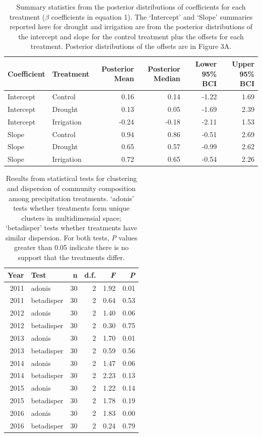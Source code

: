\documentclass[fleqn,10pt,lineno]{wlpeerj} %
\begin{document}
\begin{table}[ht]
\centering
\caption{Summary statistics from the posterior distributions of coefficients for each treatment ($\beta$ coefficients in equation 1). The `Intercept' and `Slope' summaries reported here for drought and irrigation are from the posterior distributions of the intercept and slope for the control treatment plus the offsets for each treatment. Posterior distributions of the offsets are in Figure 3A.} 
\begingroup\normalsize
\begin{tabular}{llrrrr}
  \hline
Coefficient & Treatment & Posterior Mean & Posterior Median & Lower 95\% BCI & Upper 95\% BCI \\ 
  \hline
Intercept & Control & 0.16 & 0.14 & -1.22 & 1.69 \\ 
  Intercept & Drought & 0.13 & 0.05 & -1.69 & 2.39 \\ 
  Intercept & Irrigation & -0.24 & -0.18 & -2.11 & 1.53 \\ 
  Slope & Control & 0.94 & 0.86 & -0.51 & 2.69 \\ 
  Slope & Drought & 0.65 & 0.57 & -0.99 & 2.62 \\ 
  Slope & Irrigation & 0.72 & 0.65 & -0.54 & 2.26 \\ 
   \hline
\end{tabular}
\endgroup
\end{table}\begin{table}[ht]
\centering
\caption{Results from statistical tests for clustering and dispersion of community composition among precipitation treatments. `adonis' tests whether treatments form unique clusters in multidimensial space; `betadisper' tests whether treatments have similar dispersion. For both tests, \emph{P} values greater than 0.05 indicate there is no support that the treatments differ.} 
\begingroup\normalsize
\begin{tabular}{rlrrrr}
  \hline
Year & Test & n & d.f. & \emph{F} & \emph{P} \\ 
  \hline
2011 & adonis &  30 &   2 & 1.92 & 0.01 \\ 
  2011 & betadisper &  30 &   2 & 0.64 & 0.53 \\ 
  2012 & adonis &  30 &   2 & 1.40 & 0.06 \\ 
  2012 & betadisper &  30 &   2 & 0.30 & 0.75 \\ 
  2013 & adonis &  30 &   2 & 1.70 & 0.01 \\ 
  2013 & betadisper &  30 &   2 & 0.59 & 0.56 \\ 
  2014 & adonis &  30 &   2 & 1.47 & 0.06 \\ 
  2014 & betadisper &  30 &   2 & 2.23 & 0.13 \\ 
  2015 & adonis &  30 &   2 & 1.22 & 0.14 \\ 
  2015 & betadisper &  30 &   2 & 1.78 & 0.19 \\ 
  2016 & adonis &  30 &   2 & 1.83 & 0.00 \\ 
  2016 & betadisper &  30 &   2 & 0.24 & 0.79 \\ 
   \hline
\end{tabular}
\endgroup
\end{table}
\end{document}
